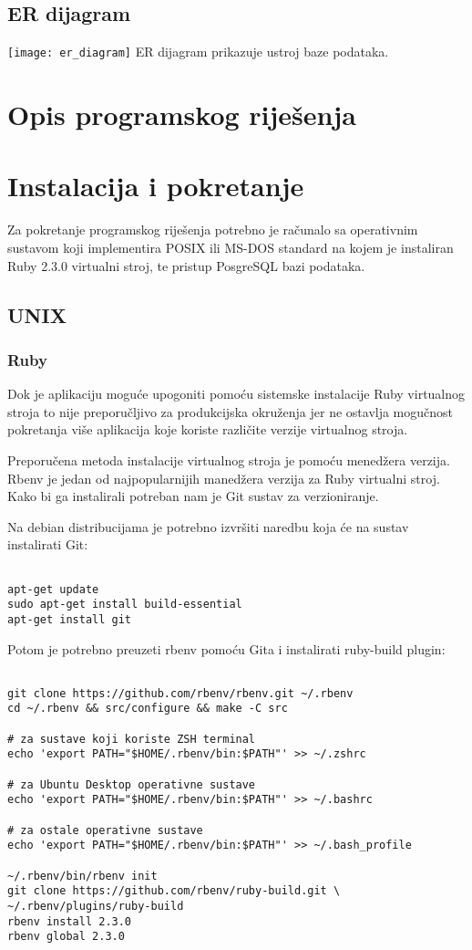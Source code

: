 \documentclass[times, utf8, zavrsni]{fer}
\begin{document}
\section{ER dijagram}
\texttt{[image: er\_diagram]}
ER dijagram prikazuje ustroj baze podataka.

\chapter{Opis programskog riješenja}

\chapter{Instalacija i pokretanje}
Za pokretanje programskog riješenja potrebno je računalo sa operativnim sustavom
koji implementira POSIX ili MS-DOS standard na kojem je instaliran Ruby 2.3.0
virtualni stroj, te pristup PosgreSQL bazi podataka.

\section{UNIX}
\subsection{Ruby}
Dok je aplikaciju moguće upogoniti pomoću sistemske instalacije Ruby virtualnog
stroja to nije preporučljivo za produkcijska okruženja jer ne ostavlja mogučnost
pokretanja više aplikacija koje koriste različite verzije virtualnog stroja.

Preporučena metoda instalacije virtualnog stroja je pomoću menedžera verzija.
Rbenv je jedan od najpopularnijih manedžera verzija za Ruby virtualni stroj.
Kako bi ga instalirali potreban nam je Git sustav za verzioniranje.

Na debian distribucijama je potrebno izvršiti naredbu koja će na sustav
instalirati Git:

\begin{lstlisting}

apt-get update
sudo apt-get install build-essential
apt-get install git

\end{lstlisting}

Potom je potrebno preuzeti rbenv pomoću Gita i instalirati ruby-build plugin:

\begin{lstlisting}

git clone https://github.com/rbenv/rbenv.git ~/.rbenv
cd ~/.rbenv && src/configure && make -C src

# za sustave koji koriste ZSH terminal
echo 'export PATH="$HOME/.rbenv/bin:$PATH"' >> ~/.zshrc

# za Ubuntu Desktop operativne sustave
echo 'export PATH="$HOME/.rbenv/bin:$PATH"' >> ~/.bashrc

# za ostale operativne sustave
echo 'export PATH="$HOME/.rbenv/bin:$PATH"' >> ~/.bash_profile

~/.rbenv/bin/rbenv init
git clone https://github.com/rbenv/ruby-build.git \
~/.rbenv/plugins/ruby-build
rbenv install 2.3.0
rbenv global 2.3.0

\end{lstlisting}
\end{document}
